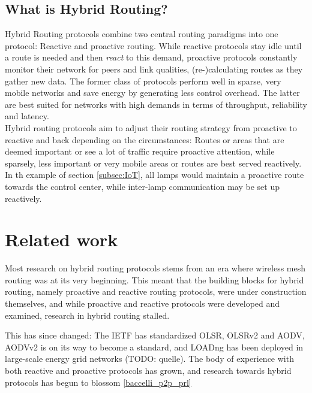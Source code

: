 \documentclass[a4paper,10pt]{scrartcl}
\begin{document}
\subsection{What is Hybrid Routing?}
\label{subsec:hybrid}
Hybrid Routing protocols combine two central routing paradigms into one protocol: Reactive and proactive routing. While reactive protocols stay idle until a route is needed and then \emph{react} to this demand, proactive protocols constantly monitor their network for peers and link qualities, (re-)calculating routes as they gather new data. The former class of protocols perform well in sparse, very mobile networks and save energy by generating less control overhead. The latter are best suited for networks with high demands in terms of throughput, reliability and latency.\\
Hybrid routing protocols aim to adjust their routing strategy from proactive to reactive and back depending on the circumstances: Routes or areas that are deemed important or see a lot of traffic require proactive attention, while sparsely, less important or very mobile areas or routes are best served reactively.\\
In th example of section \ref{subsec:IoT}, all lamps would maintain a proactive route towards the control center, while inter-lamp communication may be set up reactively.

\section{Related work}
\label{sec:related_work}

Most research on hybrid routing protocols stems from an era where wireless mesh routing was at its very beginning. This meant that the building blocks for hybrid routing, namely proactive and reactive routing protocols, were under construction themselves, and while proactive and reactive protocols were developed and examined, research in hybrid routing stalled. 

This has since changed: The \gls{IETF} has standardized \gls{OLSR}, OLSRv2  and \gls{AODV}, AODVv2 is on its way to become a standard, and \gls{LOADng} has been deployed in large-scale energy grid networks (TODO: quelle). The body of experience with both reactive and proactive protocols has grown, and research towards hybrid protocols has begun to blossom \ref{baccelli_p2p_prl}\\
\end{document}
